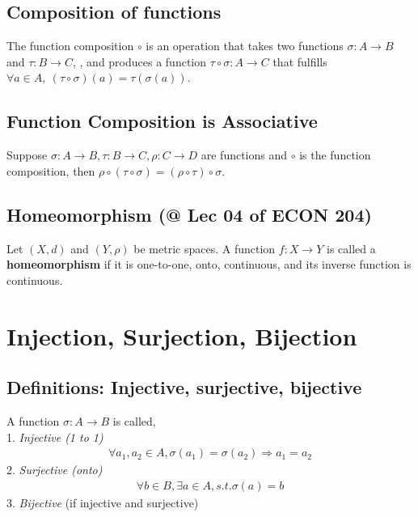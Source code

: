 \documentclass[11pt]{elegantbook}
\begin{document}
\subsection{Composition of functions}
\begin{definition}
\normalfont
The function composition $\circ$ is an operation that takes two functions $\sigma: A\rightarrow B$ and $\tau: B\rightarrow C$, , and produces a function $\tau\circ \sigma:A\rightarrow C$ that fulfills $\forall a\in A,\ (\tau\circ \sigma)(a)=\tau( \sigma(a))$.
\end{definition}

\subsection{Function Composition is Associative}
\begin{proposition}
    Suppose $\sigma:A \rightarrow B, \tau:B \rightarrow C, \rho:C \rightarrow D$ are functions and $\circ$ is the function composition, then $\rho\circ(\tau\circ\sigma)=(\rho\circ\tau)\circ\sigma$.
\end{proposition}


\subsection{Homeomorphism \small{(@ Lec 04 of ECON 204)}}
\begin{definition}[Homeomorphism]
    \normalfont
    Let $(X, d)$ and $(Y, \rho)$ be metric spaces. A function $f : X \rightarrow Y$ is called a \textbf{homeomorphism} if it is one-to-one, onto, continuous, and its inverse function is continuous.
\end{definition}

\section{Injection, Surjection, Bijection}
\subsection{Definitions: Injective, surjective, bijective}
A function $\sigma:A \rightarrow B$ is called,\\
1. \textit{Injective (1 to 1)}
\begin{equation}
    \begin{aligned}
        \forall a_1,a_2\in A, \sigma(a_1)=\sigma(a_2)\Rightarrow a_1=a_2
    \end{aligned}
    \nonumber
\end{equation}
2. \textit{Surjective (onto)}
\begin{equation}
    \begin{aligned}
        \forall b\in B,\exists a\in A, s.t. \sigma(a)=b
    \end{aligned}
    \nonumber
\end{equation}
3. \textit{Bijective} (if injective and surjective)
\end{document}
